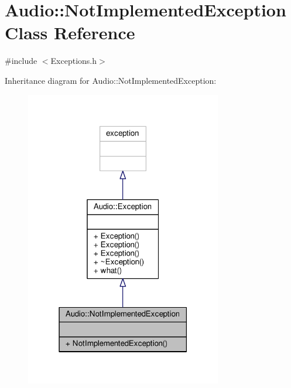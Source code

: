\hypertarget{classAudio_1_1NotImplementedException}{}\section{Audio\+:\+:Not\+Implemented\+Exception Class Reference}
\label{classAudio_1_1NotImplementedException}


{\ttfamily \#include $<$Exceptions.\+h$>$}



Inheritance diagram for Audio\+:\+:Not\+Implemented\+Exception\+:
\nopagebreak
\begin{figure}[H]
\begin{center}
\leavevmode
\includegraphics[width=243pt]{db/df0/classAudio_1_1NotImplementedException__inherit__graph}
\end{center}
\end{figure}



